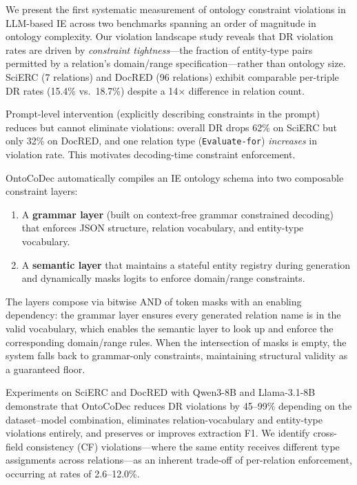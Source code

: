 \documentclass[11pt,a4paper]{article}
\newcommand{\method}{OntoCoDec}
\begin{document}
We present the first systematic measurement of ontology constraint violations in LLM-based IE across two benchmarks spanning an order of magnitude in ontology complexity. Our violation landscape study reveals that DR violation rates are driven by \emph{constraint tightness}---the fraction of entity-type pairs permitted by a relation's domain/range specification---rather than ontology size. SciERC (7 relations) and DocRED (96 relations) exhibit comparable per-triple DR rates (15.4\% vs.\ 18.7\%) despite a 14$\times$ difference in relation count.

Prompt-level intervention (explicitly describing constraints in the prompt) reduces but cannot eliminate violations: overall DR drops 62\% on SciERC but only 32\% on DocRED, and one relation type (\texttt{Evaluate-for}) \emph{increases} in violation rate. This motivates decoding-time constraint enforcement.

\method{} automatically compiles an IE ontology schema into two composable constraint layers:
\begin{enumerate}
    \item A \textbf{grammar layer} (built on context-free grammar constrained decoding) that enforces JSON structure, relation vocabulary, and entity-type vocabulary.
    \item A \textbf{semantic layer} that maintains a stateful entity registry during generation and dynamically masks logits to enforce domain/range constraints.
\end{enumerate}
The layers compose via bitwise AND of token masks with an enabling dependency: the grammar layer ensures every generated relation name is in the valid vocabulary, which enables the semantic layer to look up and enforce the corresponding domain/range rules. When the intersection of masks is empty, the system falls back to grammar-only constraints, maintaining structural validity as a guaranteed floor.

Experiments on SciERC and DocRED with Qwen3-8B and Llama-3.1-8B demonstrate that \method{} reduces DR violations by 45--99\% depending on the dataset--model combination, eliminates relation-vocabulary and entity-type violations entirely, and preserves or improves extraction F1. We identify cross-field consistency (CF) violations---where the same entity receives different type assignments across relations---as an inherent trade-off of per-relation enforcement, occurring at rates of 2.6--12.0\%.

\end{document}
